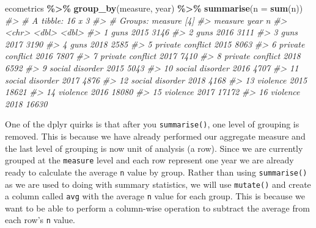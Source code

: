\documentclass[
]{book}
\newenvironment{Shaded}{\begin{snugshade}}{\end{snugshade}}
\newcommand{\CommentTok}[1]{\textcolor[rgb]{0.56,0.35,0.01}{\textit{#1}}}
\newcommand{\DataTypeTok}[1]{\textcolor[rgb]{0.13,0.29,0.53}{#1}}
\newcommand{\KeywordTok}[1]{\textcolor[rgb]{0.13,0.29,0.53}{\textbf{#1}}}
\newcommand{\NormalTok}[1]{#1}
\newcommand{\OperatorTok}[1]{\textcolor[rgb]{0.81,0.36,0.00}{\textbf{#1}}}
\newcommand{\StringTok}[1]{\textcolor[rgb]{0.31,0.60,0.02}{#1}}
\begin{document}
\begin{Shaded}
\begin{Highlighting}[]
\NormalTok{ecometrics }\OperatorTok{\%\textgreater{}\%}\StringTok{ }
\StringTok{  }\KeywordTok{group\_by}\NormalTok{(measure, year) }\OperatorTok{\%\textgreater{}\%}\StringTok{ }
\StringTok{  }\KeywordTok{summarise}\NormalTok{(}\DataTypeTok{n =} \KeywordTok{sum}\NormalTok{(n))}
\CommentTok{\#\textgreater{} \# A tibble: 16 x 3}
\CommentTok{\#\textgreater{} \# Groups:   measure [4]}
\CommentTok{\#\textgreater{}    measure           year     n}
\CommentTok{\#\textgreater{}    \textless{}chr\textgreater{}            \textless{}dbl\textgreater{} \textless{}dbl\textgreater{}}
\CommentTok{\#\textgreater{}  1 guns              2015  3146}
\CommentTok{\#\textgreater{}  2 guns              2016  3111}
\CommentTok{\#\textgreater{}  3 guns              2017  3190}
\CommentTok{\#\textgreater{}  4 guns              2018  2585}
\CommentTok{\#\textgreater{}  5 private conflict  2015  8063}
\CommentTok{\#\textgreater{}  6 private conflict  2016  7807}
\CommentTok{\#\textgreater{}  7 private conflict  2017  7410}
\CommentTok{\#\textgreater{}  8 private conflict  2018  6592}
\CommentTok{\#\textgreater{}  9 social disorder   2015  5043}
\CommentTok{\#\textgreater{} 10 social disorder   2016  4707}
\CommentTok{\#\textgreater{} 11 social disorder   2017  4876}
\CommentTok{\#\textgreater{} 12 social disorder   2018  4168}
\CommentTok{\#\textgreater{} 13 violence          2015 18621}
\CommentTok{\#\textgreater{} 14 violence          2016 18080}
\CommentTok{\#\textgreater{} 15 violence          2017 17172}
\CommentTok{\#\textgreater{} 16 violence          2018 16630}
\end{Highlighting}
\end{Shaded}

One of the dplyr quirks is that after you \texttt{summarise()}, one level of grouping is removed. This is because we have already performed our aggregate measure and the last level of grouping is now unit of analysis (a row). Since we are currently grouped at the \texttt{measure} level and each row represent one year we are already ready to calculate the average \texttt{n} value by group. Rather than using \texttt{summarise()} as we are used to doing with summary statistics, we will use \texttt{mutate()} and create a column called \texttt{avg} with the average \texttt{n} value for each group. This is because we want to be able to perform a column-wise operation to subtract the average from each row's \texttt{n} value.
\end{document}
